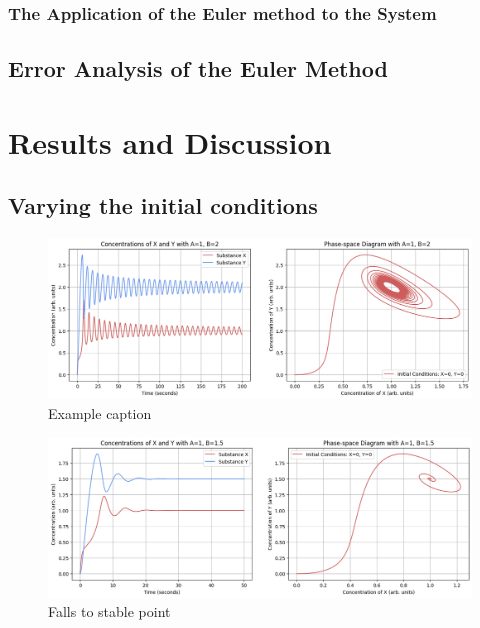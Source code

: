\documentclass[reprint, amsmath, amssymb, aps]{revtex4-2}
\begin{document}
\subsubsection{The Application of the Euler method to the System}

\subsection{Error Analysis of the Euler Method}

\section{Results and Discussion}

\subsection{Varying the initial conditions}

\begin{figure}
\includegraphics[width=2\columnwidth]{combinedPlot.png}
\caption{\label{fig:combinedPlot}Example caption}
\end{figure}

\begin{figure}
\includegraphics[width=2\columnwidth]{combinedPlot_fallToStable.png}
\caption{\label{fig:combinedPlot}Falls to stable point}
\end{figure}
\end{document}

